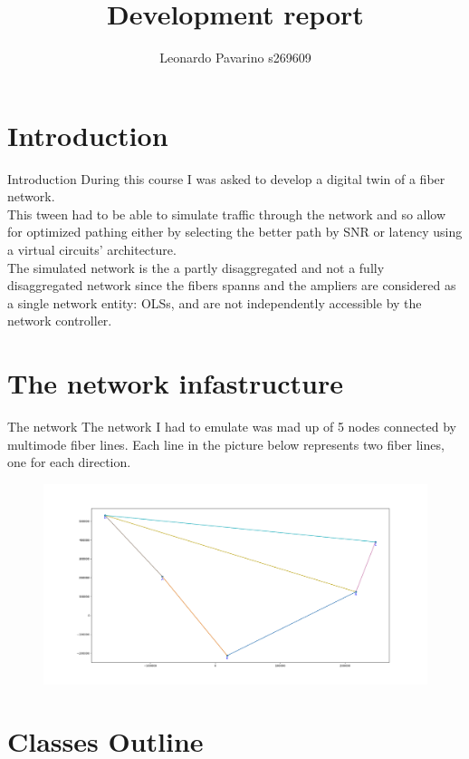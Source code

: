 \documentclass{beamer}
\title{Development report}
\author[Author]{Leonardo Pavarino s269609}
\institute [Politecnico di Torino]%
{ 
	Leonardo Pavarino s269609\\
	Open and virtualized networks\\
	Politecnico di Torino  
}
\affil{Open and Virtualized networks}
\date[2022]{}
\begin{document}
	\maketitle
	\section{Introduction}
	\begin{frame}{Introduction}
		During this course I was asked to develop a digital twin of a fiber network.\\
		This tween had to be able to simulate traffic through the network and so allow for optimized pathing either by selecting the better path by SNR or latency using a virtual circuits' architecture.\\
		The simulated network is the a partly disaggregated and not a fully disaggregated network since the fibers spanns and the ampliers are considered as a single network entity: OLSs, and are not independently accessible by the network controller.
	\end{frame}
	\section{The network infastructure}
	\begin{frame}{The network}
		The network I had to emulate was mad up of 5 nodes connected by multimode fiber lines. Each line in the picture below represents two fiber lines, one for each direction.
		\begin{figure}
			\centering
			\label{fig:network}
			\includegraphics[width=\linewidth]{Pictures/my network.png}
		\end{figure}
	\end{frame}
	\section{Classes Outline}
\end{document}
